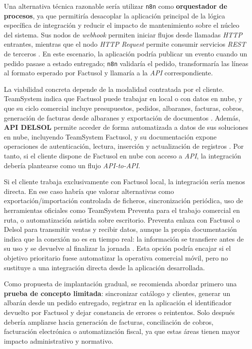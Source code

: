 Una alternativa técnica razonable sería utilizar \texttt{n8n} como \textbf{orquestador de procesos}, ya que permitiría desacoplar la aplicación principal de la lógica específica de integración y reducir el impacto de mantenimiento sobre el núcleo del sistema. Sus nodos de \textit{webhook} permiten iniciar flujos desde llamadas \textit{HTTP} entrantes, mientras que el nodo \textit{HTTP Request} permite consumir servicios \textit{REST} de terceros \citep{n8n-webhook,n8n-http-request}. En este escenario, la aplicación podría publicar un evento cuando un pedido pasase a estado entregado; \texttt{n8n} validaría el pedido, transformaría las líneas al formato esperado por Factusol y llamaría a la \textit{API} correspondiente.

La viabilidad concreta depende de la modalidad contratada por el cliente. TeamSystem indica que Factusol puede trabajar en local o con datos en nube, y que su ciclo comercial incluye presupuestos, pedidos, albaranes, facturas, cobros, generación de facturas desde albaranes y exportación de documentos \citep{sdelsol-factusol}. Además, \textbf{API DELSOL} permite acceder de forma automatizada a datos de sus soluciones en nube, incluyendo TeamSystem Factusol, y su documentación expone operaciones de autenticación, lectura, inserción y actualización de registros \citep{sdelsol-api,sdelsol-api-doc}. Por tanto, si el cliente dispone de Factusol en nube con acceso a \textit{API}, la integración debería plantearse como un flujo \textit{API-to-API}.

Si el cliente trabaja exclusivamente con Factusol local, la integración sería menos directa. En ese caso habría que valorar alternativas como exportación/importación controlada de ficheros, sincronización periódica, uso de herramientas oficiales como TeamSystem Preventa para el trabajo comercial en ruta, o automatización asistida sobre escritorio. Preventa enlaza con Factusol o Delsol para transmitir ventas y recibir datos, aunque la propia documentación indica que la conexión no es en tiempo real: la información se transfiere antes de su uso y se devuelve al finalizar la jornada \citep{sdelsol-preventa}. Esta opción podría encajar si el objetivo prioritario fuese automatizar la operativa comercial móvil, pero no sustituye a una integración directa desde la aplicación desarrollada.

Como propuesta de implantación gradual, se recomienda abordar primero una \textbf{prueba de concepto limitada}: sincronizar catálogo y clientes, generar un albarán desde un pedido entregado, registrar en la aplicación el identificador devuelto por Factusol y dejar constancia de errores o reintentos. Solo después debería ampliarse hacia generación de facturas, conciliación de cobros, facturación electrónica o automatización fiscal, ya que estas áreas tienen mayor impacto administrativo y normativo.

